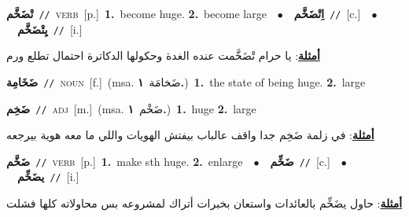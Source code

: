 \documentclass[10pt,a4paper,twoside]{article} %
\begin{document}
\begin{multicols}{2}
{\setlength\topsep{0pt}\textbf{\foreignlanguage{arabic}{تْضَخَّم}}\ {\color{gray}\texttt{//}\color{black}}\ \textsc{verb}\ [p.]\ \textbf{1.}~become huge.  \textbf{2.}~become large\ \ $\bullet$\ \ \setlength\topsep{0pt}\textbf{\foreignlanguage{arabic}{اِتْضَخَّم}}\ {\color{gray}\texttt{//}\color{black}}\ [c.]\ \ $\bullet$\ \ \setlength\topsep{0pt}\textbf{\foreignlanguage{arabic}{يِتْضَخَّم}}\ {\color{gray}\texttt{//}\color{black}}\ [i.]\  \begin{flushright}\color{gray}\foreignlanguage{arabic}{\textbf{\underline{\foreignlanguage{arabic}{أمثلة}}}: يا حرام تْضَخَّمت عنده الغدة وحكولها الدكاترة احتمال تطلع ورم}\end{flushright}\color{black}} \vspace{2mm}

{\setlength\topsep{0pt}\textbf{\foreignlanguage{arabic}{ضَخَامِة}}\ {\color{gray}\texttt{//}\color{black}}\ \textsc{noun}\ [f.]\ \color{gray}(msa. \foreignlanguage{arabic}{ضَخامَة}~\foreignlanguage{arabic}{\textbf{١.}})\color{black}\ \textbf{1.}~the state of being huge.  \textbf{2.}~large\ } \vspace{2mm}

{\setlength\topsep{0pt}\textbf{\foreignlanguage{arabic}{ضَخِم}}\ {\color{gray}\texttt{//}\color{black}}\ \textsc{adj}\ [m.]\ \color{gray}(msa. \foreignlanguage{arabic}{ضَخْم}~\foreignlanguage{arabic}{\textbf{١.}})\color{black}\ \textbf{1.}~huge  \textbf{2.}~large\  \begin{flushright}\color{gray}\foreignlanguage{arabic}{\textbf{\underline{\foreignlanguage{arabic}{أمثلة}}}: في زلمة ضَخِم جدا واقف عالباب بيفتش الهويات واللي ما معه هوية بيرجعه}\end{flushright}\color{black}} \vspace{2mm}

{\setlength\topsep{0pt}\textbf{\foreignlanguage{arabic}{ضَخَّم}}\ {\color{gray}\texttt{//}\color{black}}\ \textsc{verb}\ [p.]\ \textbf{1.}~make sth huge.  \textbf{2.}~enlarge\ \ $\bullet$\ \ \setlength\topsep{0pt}\textbf{\foreignlanguage{arabic}{ضَخِّم}}\ {\color{gray}\texttt{//}\color{black}}\ [c.]\ \ $\bullet$\ \ \setlength\topsep{0pt}\textbf{\foreignlanguage{arabic}{يضَخِّم}}\ {\color{gray}\texttt{//}\color{black}}\ [i.]\  \begin{flushright}\color{gray}\foreignlanguage{arabic}{\textbf{\underline{\foreignlanguage{arabic}{أمثلة}}}: حاول يضَخِّم بالعائدات واستعان بخبرات أتراك لمشروعه بس محاولاته كلها فشلت}\end{flushright}\color{black}} \vspace{2mm}


\end{multicols}
\end{document}
